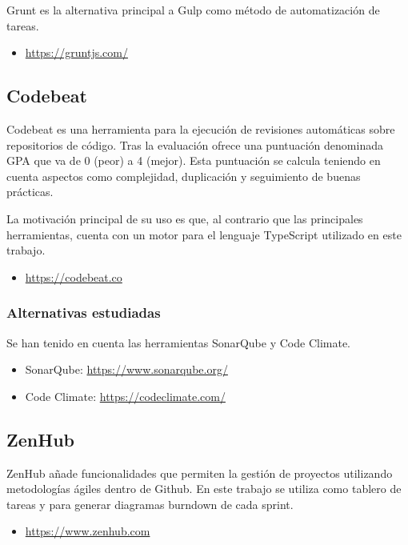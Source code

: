 Grunt es la alternativa principal a Gulp como método de automatización de tareas.

\begin{itemize}
	\item \url{https://gruntjs.com/}
\end{itemize}

\subsection{Codebeat}

Codebeat es una herramienta para la ejecución de revisiones automáticas sobre repositorios de código. Tras la evaluación ofrece una puntuación denominada GPA que va de 0 (peor) a 4 (mejor). Esta puntuación se calcula teniendo en cuenta aspectos como complejidad, duplicación y seguimiento de buenas prácticas.

La motivación principal de su uso es que, al contrario que las principales herramientas, cuenta con un motor para el lenguaje TypeScript utilizado en este trabajo.

\begin{itemize}
	\item \url{https://codebeat.co}
\end{itemize}

\subsubsection{Alternativas estudiadas}

Se han tenido en cuenta las herramientas SonarQube y Code Climate.
\begin{itemize}
	\item SonarQube: \url{https://www.sonarqube.org/}
	\item Code Climate: \url{https://codeclimate.com/}
\end{itemize}

\subsection{ZenHub}

ZenHub añade funcionalidades que permiten la gestión de proyectos utilizando metodologías ágiles dentro de Github. En este trabajo se utiliza como tablero de tareas y para generar diagramas burndown de cada sprint.

\begin{itemize}
	\item \url{https://www.zenhub.com}
\end{itemize}

